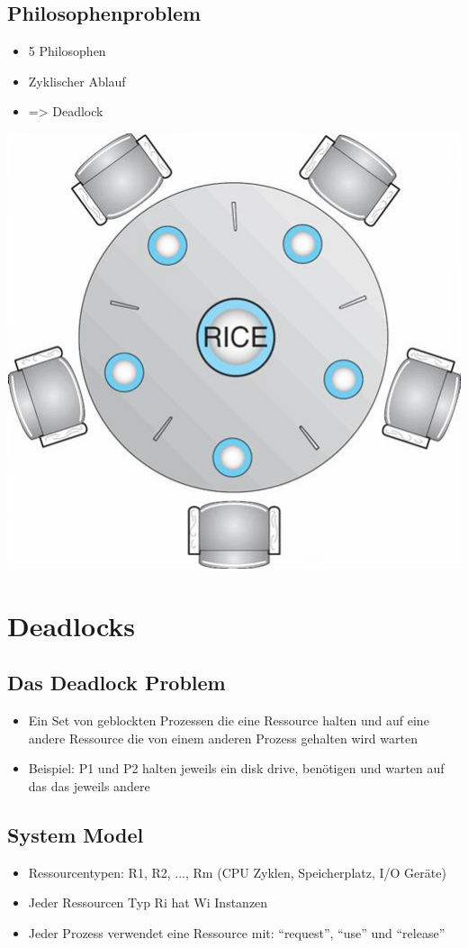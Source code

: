 \documentclass[a4paper]{scrreprt}
\begin{document}
		\subsection{Philosophenproblem}
			\begin{itemize}
				\item 5 Philosophen
				\item Zyklischer Ablauf
				\item => Deadlock
			\end{itemize}
			\includegraphics[scale=0.35]{graphics/philprob.png}
	\section{Deadlocks}
		\subsection{Das Deadlock Problem}
			\begin{itemize}
				\item Ein Set von geblockten Prozessen die eine Ressource halten und auf eine andere Ressource die von einem anderen Prozess gehalten wird warten
				\item Beispiel: P1 und P2 halten jeweils ein disk drive, benötigen und warten auf das das jeweils andere
			\end{itemize}
		\subsection{System Model}
			\begin{itemize}
				\item Ressourcentypen: R1, R2, ..., Rm (CPU Zyklen, Speicherplatz, I/O Geräte)
				\item Jeder Ressourcen Typ Ri hat Wi Instanzen
				\item Jeder Prozess verwendet eine Ressource mit: "`request"', "`use"' und "`release"'
			\end{itemize}
\end{document}
